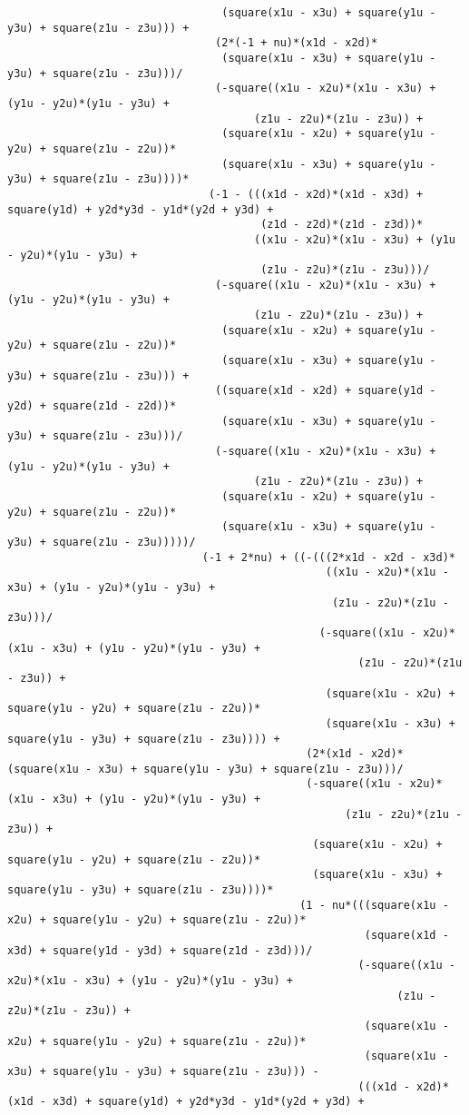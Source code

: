 \begin{lstlisting}
								 (square(x1u - x3u) + square(y1u - y3u) + square(z1u - z3u))) + 
								(2*(-1 + nu)*(x1d - x2d)*
								 (square(x1u - x3u) + square(y1u - y3u) + square(z1u - z3u)))/
								(-square((x1u - x2u)*(x1u - x3u) + (y1u - y2u)*(y1u - y3u) + 
									  (z1u - z2u)*(z1u - z3u)) + 
								 (square(x1u - x2u) + square(y1u - y2u) + square(z1u - z2u))*
								 (square(x1u - x3u) + square(y1u - y3u) + square(z1u - z3u))))*
							   (-1 - (((x1d - x2d)*(x1d - x3d) + square(y1d) + y2d*y3d - y1d*(y2d + y3d) + 
									   (z1d - z2d)*(z1d - z3d))*
									  ((x1u - x2u)*(x1u - x3u) + (y1u - y2u)*(y1u - y3u) + 
									   (z1u - z2u)*(z1u - z3u)))/
								(-square((x1u - x2u)*(x1u - x3u) + (y1u - y2u)*(y1u - y3u) + 
									  (z1u - z2u)*(z1u - z3u)) + 
								 (square(x1u - x2u) + square(y1u - y2u) + square(z1u - z2u))*
								 (square(x1u - x3u) + square(y1u - y3u) + square(z1u - z3u))) + 
								((square(x1d - x2d) + square(y1d - y2d) + square(z1d - z2d))*
								 (square(x1u - x3u) + square(y1u - y3u) + square(z1u - z3u)))/
								(-square((x1u - x2u)*(x1u - x3u) + (y1u - y2u)*(y1u - y3u) + 
									  (z1u - z2u)*(z1u - z3u)) + 
								 (square(x1u - x2u) + square(y1u - y2u) + square(z1u - z2u))*
								 (square(x1u - x3u) + square(y1u - y3u) + square(z1u - z3u)))))/
							  (-1 + 2*nu) + ((-(((2*x1d - x2d - x3d)*
												 ((x1u - x2u)*(x1u - x3u) + (y1u - y2u)*(y1u - y3u) + 
												  (z1u - z2u)*(z1u - z3u)))/
												(-square((x1u - x2u)*(x1u - x3u) + (y1u - y2u)*(y1u - y3u) + 
													  (z1u - z2u)*(z1u - z3u)) + 
												 (square(x1u - x2u) + square(y1u - y2u) + square(z1u - z2u))*
												 (square(x1u - x3u) + square(y1u - y3u) + square(z1u - z3u)))) + 
											  (2*(x1d - x2d)*(square(x1u - x3u) + square(y1u - y3u) + square(z1u - z3u)))/
											  (-square((x1u - x2u)*(x1u - x3u) + (y1u - y2u)*(y1u - y3u) + 
													(z1u - z2u)*(z1u - z3u)) + 
											   (square(x1u - x2u) + square(y1u - y2u) + square(z1u - z2u))*
											   (square(x1u - x3u) + square(y1u - y3u) + square(z1u - z3u))))*
											 (1 - nu*(((square(x1u - x2u) + square(y1u - y2u) + square(z1u - z2u))*
													   (square(x1d - x3d) + square(y1d - y3d) + square(z1d - z3d)))/
													  (-square((x1u - x2u)*(x1u - x3u) + (y1u - y2u)*(y1u - y3u) + 
															(z1u - z2u)*(z1u - z3u)) + 
													   (square(x1u - x2u) + square(y1u - y2u) + square(z1u - z2u))*
													   (square(x1u - x3u) + square(y1u - y3u) + square(z1u - z3u))) - 
													  (((x1d - x2d)*(x1d - x3d) + square(y1d) + y2d*y3d - y1d*(y2d + y3d) + 

\end{lstlisting}
